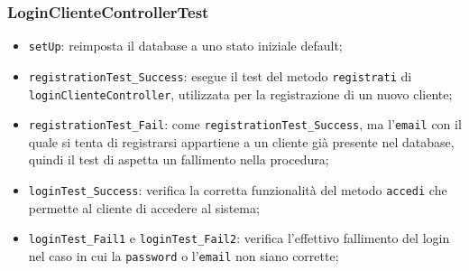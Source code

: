 \documentclass{article}
\newcommand{\code}[1]{\texttt{#1}}
\begin{document}
\subsubsection{LoginClienteControllerTest}
\begin{itemize}
    \item \code{setUp}: reimposta il database a uno stato iniziale default;
    \item \code{registrationTest\_Success}: esegue il test del metodo \code{registrati} di \code{loginClienteController}, utilizzata per la registrazione di un nuovo cliente;
    \item \code{registrationTest\_Fail}: come \code{registrationTest\_Success}, ma l'\code{email} con il quale si tenta di registrarsi appartiene a un cliente già presente nel database, quindi il test di aspetta un fallimento nella procedura;
    \item \code{loginTest\_Success}: verifica la corretta funzionalità del metodo \code{accedi} che permette al cliente di accedere al sistema;
    \item \code{loginTest\_Fail1} e \code{loginTest\_Fail2}: verifica l'effettivo fallimento del login nel caso in cui la \code{password} o l'\code{email} non siano corrette;    
\end{itemize}
\end{document}
